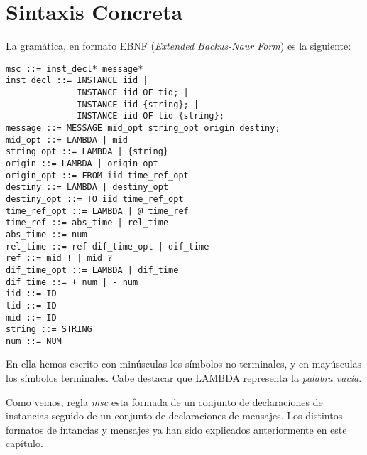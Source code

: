 \section{Sintaxis Concreta}

La gramática, en formato EBNF (\emph{Extended Backus-Naur Form}) es la 
siguiente:
\begin{lstlisting}[style=spec, language={}]
msc ::= inst_decl* message*
inst_decl ::= INSTANCE iid |
              INSTANCE iid OF tid; |
              INSTANCE iid {string}; |
              INSTANCE iid OF tid {string};               
message ::= MESSAGE mid_opt string_opt origin destiny;
mid_opt ::= LAMBDA | mid
string_opt ::= LAMBDA | {string}
origin ::= LAMBDA | origin_opt
origin_opt ::= FROM iid time_ref_opt
destiny ::= LAMBDA | destiny_opt
destiny_opt ::= TO iid time_ref_opt
time_ref_opt ::= LAMBDA | @ time_ref
time_ref ::= abs_time | rel_time
abs_time ::= num
rel_time ::= ref dif_time_opt | dif_time
ref ::= mid ! | mid ?
dif_time_opt ::= LAMBDA | dif_time
dif_time ::= + num | - num
iid ::= ID
tid ::= ID
mid ::= ID
string ::= STRING
num ::= NUM
\end{lstlisting}

En ella hemos escrito con minúsculas los símbolos no terminales, y en 
mayúsculas los símbolos terminales. Cabe destacar que LAMBDA
representa la \textit{palabra vacía}.

Como vemos, regla \textit{msc} esta formada de un conjunto de declaraciones de
instancias seguido de un conjunto de declaraciones de mensajes. Los distintos
formatos de intancias y mensajes ya han sido explicados anteriormente en este
capítulo.


